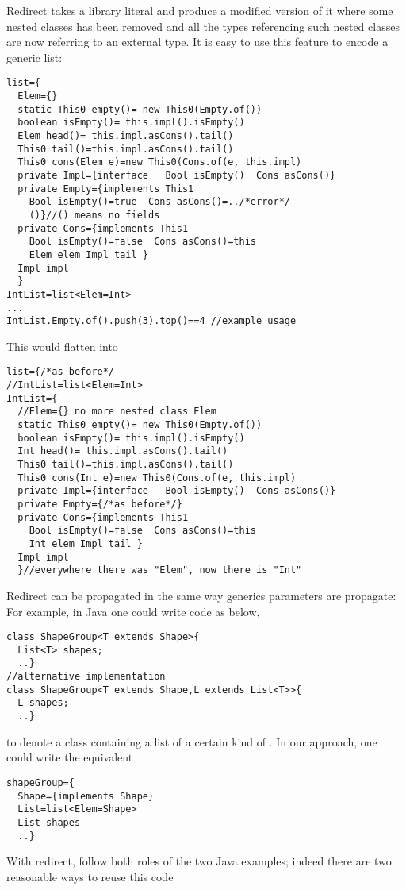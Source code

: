 Redirect %
takes a library literal and produce a modified version of it where some nested classes has been removed
and all the types referencing such nested classes are now referring to an external type. It is easy to use this feature to encode a generic list:

\begin{lstlisting}
list={
  Elem={}
  static This0 empty()= new This0(Empty.of())
  boolean isEmpty()= this.impl().isEmpty()
  Elem head()= this.impl.asCons().tail()
  This0 tail()=this.impl.asCons().tail()
  This0 cons(Elem e)=new This0(Cons.of(e, this.impl)
  private Impl={interface   Bool isEmpty()  Cons asCons()}
  private Empty={implements This1
    Bool isEmpty()=true  Cons asCons()=../*error*/
    ()}//() means no fields
  private Cons={implements This1
    Bool isEmpty()=false  Cons asCons()=this
    Elem elem Impl tail }
  Impl impl
  }
IntList=list<Elem=Int>
...
IntList.Empty.of().push(3).top()==4 //example usage
\end{lstlisting}
This would flatten into
\begin{lstlisting}
list={/*as before*/
//IntList=list<Elem=Int>
IntList={
  //Elem={} no more nested class Elem
  static This0 empty()= new This0(Empty.of())
  boolean isEmpty()= this.impl().isEmpty()
  Int head()= this.impl.asCons().tail()
  This0 tail()=this.impl.asCons().tail()
  This0 cons(Int e)=new This0(Cons.of(e, this.impl)
  private Impl={interface   Bool isEmpty()  Cons asCons()}
  private Empty={/*as before*/}
  private Cons={implements This1
    Bool isEmpty()=false  Cons asCons()=this
    Int elem Impl tail }
  Impl impl
  }//everywhere there was "Elem", now there is "Int"
\end{lstlisting}

Redirect can be propagated in the same way generics parameters are propagate:
For example, in Java one could write code as below,
\begin{lstlisting}
class ShapeGroup<T extends Shape>{
  List<T> shapes;
  ..}
//alternative implementation
class ShapeGroup<T extends Shape,L extends List<T>>{
  L shapes;
  ..}
\end{lstlisting}
to denote a class containing a list of a certain kind of \Q@Shape@s.
In our approach, one could write the equivalent
\begin{lstlisting}
shapeGroup={
  Shape={implements Shape}
  List=list<Elem=Shape>
  List shapes
  ..}
\end{lstlisting}
With redirect, \Q@shapeGroup@ follow both roles of the two Java examples;
indeed there are two reasonable ways to reuse this code

